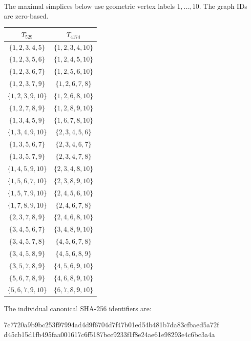 The maximal simplices below use geometric vertex labels $1,\ldots,10$. The graph IDs are zero-based.
\begin{center}\begin{tabular}{cc}\toprule $T_{529}$ & $T_{4174}$\\ \midrule
$\{1,2,3,4,5\}$ & $\{1,2,3,4,10\}$\\
$\{1,2,3,5,6\}$ & $\{1,2,4,5,10\}$\\
$\{1,2,3,6,7\}$ & $\{1,2,5,6,10\}$\\
$\{1,2,3,7,9\}$ & $\{1,2,6,7,8\}$\\
$\{1,2,3,9,10\}$ & $\{1,2,6,8,10\}$\\
$\{1,2,7,8,9\}$ & $\{1,2,8,9,10\}$\\
$\{1,3,4,5,9\}$ & $\{1,6,7,8,10\}$\\
$\{1,3,4,9,10\}$ & $\{2,3,4,5,6\}$\\
$\{1,3,5,6,7\}$ & $\{2,3,4,6,7\}$\\
$\{1,3,5,7,9\}$ & $\{2,3,4,7,8\}$\\
$\{1,4,5,9,10\}$ & $\{2,3,4,8,10\}$\\
$\{1,5,6,7,10\}$ & $\{2,3,8,9,10\}$\\
$\{1,5,7,9,10\}$ & $\{2,4,5,6,10\}$\\
$\{1,7,8,9,10\}$ & $\{2,4,6,7,8\}$\\
$\{2,3,7,8,9\}$ & $\{2,4,6,8,10\}$\\
$\{3,4,5,6,7\}$ & $\{3,4,8,9,10\}$\\
$\{3,4,5,7,8\}$ & $\{4,5,6,7,8\}$\\
$\{3,4,5,8,9\}$ & $\{4,5,6,8,9\}$\\
$\{3,5,7,8,9\}$ & $\{4,5,6,9,10\}$\\
$\{5,6,7,8,9\}$ & $\{4,6,8,9,10\}$\\
$\{5,6,7,9,10\}$ & $\{6,7,8,9,10\}$\\
\bottomrule\end{tabular}\end{center}
The individual canonical SHA-256 identifiers are:
\begin{flushleft}\small\ttfamily
7c7720a9b9bc253f97994ad4d9f6704d7f47b01ed54b481b7da83cfbaed5a72f\\
d45cb15d1fb495faa001617c6f5187bcc9233f1f8e24ae61e98293e4c6bc3a4a
\end{flushleft}
